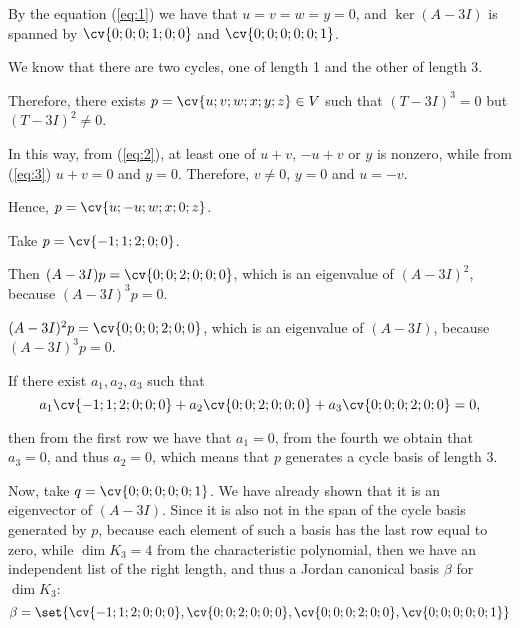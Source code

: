 \documentclass[11pt]{scrartcl}
\begin{document}
\begin{soln}
By the equation (\ref{eq:1}) we have that $u=v=w=y=0$, and
$\ker (A-3I)$ is spanned by $\cv{0;0;0;1;0;0}$ and $\cv{0;0;0;0;0;1}$.

We know that there are two cycles, one of length 1 and the other of length 3.

Therefore, there exists $p = \cv{u;v;w;x;y;z}\in V$ such that $(T-3I)^3=0$ but $(T-3I)^2\neq 0$.

In this way, from (\ref{eq:2}), at least one of $u+v$, $-u+v$ or $y$ is
nonzero, while from (\ref{eq:3}) $u+v = 0$ and $y = 0$. Therefore, $v\neq 0$, $y=0$ and $u=-v$.

Hence, $p = \cv{u;-u;w;x;0;z}$.

Take $p = \cv{-1;1;2;0;0}$.

Then $(A-3I)p = \cv{0;0;2;0;0;0}$, which is an eigenvalue of $(A-3I)^2$, because $(A-3I)^3p = 0$.

$(A-3I)^2p = \cv{0;0;0;2;0;0}$, which is an eigenvalue of $(A-3I)$, because $(A-3I)^3p =0$. 

If there exist $a_1, a_2, a_3$ such that
\begin{equation*}
  a_1\cv{-1;1;2;0;0;0} +a_2\cv{0;0;2;0;0;0} +a_3\cv{0;0;0;2;0;0} = 0,
\end{equation*}

then from the first row we have that $a_1 = 0$, from the fourth we obtain that $a_3=0$, and thus $a_2=0$, which means that $p$ generates a cycle basis of length $3$.

Now, take $q = \cv{0;0;0;0;0;1}$. We have already shown that it is an
eigenvector of $(A-3I)$. Since it is also not in the span of the cycle
basis generated by $p$, because each element of such a basis has the
last row equal to zero, while $\dim K_3 = 4$ from the characteristic
polynomial, then we have an independent list of the right length, and thus a Jordan canonical basis $\beta$ for $\dim K_3$:
\begin{equation*}
  \beta =\set{\cv{-1;1;2;0;0;0}, \cv{0;0;2;0;0;0}, \cv{0;0;0;2;0;0}, \cv{0;0;0;0;0;1}}
\end{equation*}











\end{soln}
\end{document}
